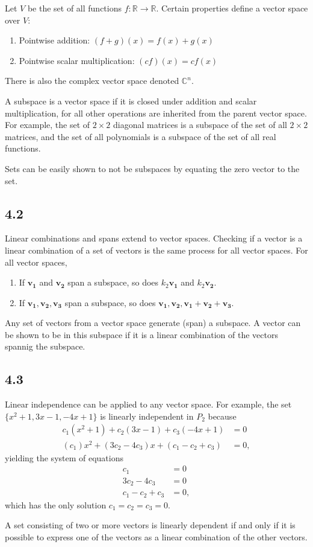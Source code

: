 \documentclass{article}
\begin{document}
    Let $V$ be the set of all functions $f: \mathbb{R} \rightarrow \mathbb{R}$. 
    Certain properties define a vector space over $V$:
    \begin{enumerate}
        \item Pointwise addition: $(f + g)(x) = f(x) + g(x)$
        \item Pointwise scalar multiplication: $(cf)(x) = cf(x)$
    \end{enumerate}
    There is also the complex vector space denoted $\mathbb{C}^n$.

    A subspace is a vector space if it is closed under addition and scalar multiplication, 
    for all other operations are inherited from the parent vector space. 
    For example, the set of $2 \times 2$ diagonal matrices is a subspace of the set of all $2 \times 2$ matrices,
    and the set of all polynomials is a subspace of the set of all real functions.

    Sets can be easily shown to not be subspaces by equating the zero vector to the set.

    \subsection*{4.2}
    Linear combinations and spans extend to vector spaces. 
    Checking if a vector is a linear combination of a set of vectors 
    is the same process for all vector spaces.
    For all vector spaces,
    \begin{enumerate}
        \item If $\mathbf{v_1}$ and $\mathbf{v_2}$ span a subspace, so does $k_2 \mathbf{v_1}$ and $k_2 \mathbf{v_2}$.
        \item If $\mathbf{v_1, v_2, v_3}$ span a subspace, so does $\mathbf{v_1, v_2, v_1 + v_2 + v_3}$.
    \end{enumerate}

    Any set of vectors from a vector space generate (span) a subspace.
    A vector can be shown to be in this subspace if it is a linear combination of the vectors spannig the subspace.

    \subsection*{4.3}
    Linear independence can be applied to any vector space.
    For example, 
    the set $\{x^2 + 1, 3x - 1, -4x +  1\}$ is linearly independent in $P_2$ 
    because 
    \begin{align*}
        c_1(x^2 + 1) + c_2(3x - 1) + c_3(-4x + 1) &= 0 \\
        (c_1)x^2 + (3c_2 - 4c_3)x + (c_1 - c_2 + c_3) &= 0,
    \end{align*}
    yielding the system of equations
    \begin{align*}
        c_1 &= 0 \\
        3c_2 - 4c_3 &= 0 \\
        c_1 - c_2 + c_3 &= 0,
    \end{align*}
    which has the only solution $c_1 = c_2 = c_3 = 0$.

    A set consisting of two or more vectors is linearly dependent if and only if  
    it is possible to express one of the vectors as a linear combination of the other vectors.
    
\end{document}
